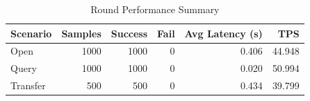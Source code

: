 \begin{table}
\caption{Round Performance Summary}
\label{tab:round_perf}
\begin{tabular}{lrrrrr}
\toprule
Scenario & Samples & Success & Fail & Avg Latency (s) & TPS \\
\midrule
Open & 1000 & 1000 & 0 & 0.406 & 44.948 \\
Query & 1000 & 1000 & 0 & 0.020 & 50.994 \\
Transfer & 500 & 500 & 0 & 0.434 & 39.799 \\
\bottomrule
\end{tabular}
\end{table}
